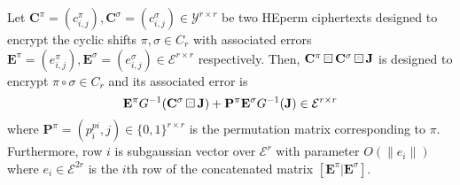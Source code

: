 \begin{theorem}\label{thm:HEPerm_product}
    Let $\mathbf{C}^{\pi} = (c^{\pi}_{i,j}), \mathbf{C}^{\sigma} = (c^{\sigma}_{i,j}) \in \mathcal{Y}^{r \times r}$ be two HEperm ciphertexts designed to encrypt the cyclic shifts $\pi, \sigma \in C_r$ with associated errors $\mathbf{E}^{\pi} = (e^{\pi}_{i,j}), \mathbf{E}^{\sigma} = (e^{\sigma}_{i,j}) \in \mathcal{E}^{r \times r}$ respectively. Then, $\mathbf{C}^{\pi} \boxring \mathbf{C}^{\sigma} \boxring \mathbf{J}$ is designed to encrypt $\pi \circ \sigma \in C_r$ and its associated error is
    \begin{equation}
        \mathbf{E}^{\pi} G^{-1}(\mathbf{C}^\sigma \boxring \mathbf{J}) + \mathbf{P}^{\pi} \mathbf{E}^{\sigma}G^{-1}(\mathbf{J}) \in \mathcal{E}^{r \times r} 
    \end{equation}
    where $\mathbf{P}^{\pi} = (p^{pi}_i,j) \in \{0,1\}^{r \times r}$ is the permutation matrix corresponding to $\pi$. Furthermore, row $i$ is subgaussian vector over $\mathcal{E}^r$ with parameter $O(\|e_i\|)$ where $e_i \in \mathcal{E}^{2r}$ is the $i$th row of the concatenated matrix $[\mathbf{E}^{\pi} | \mathbf{E}^{\sigma}]$. 
\end{theorem}
